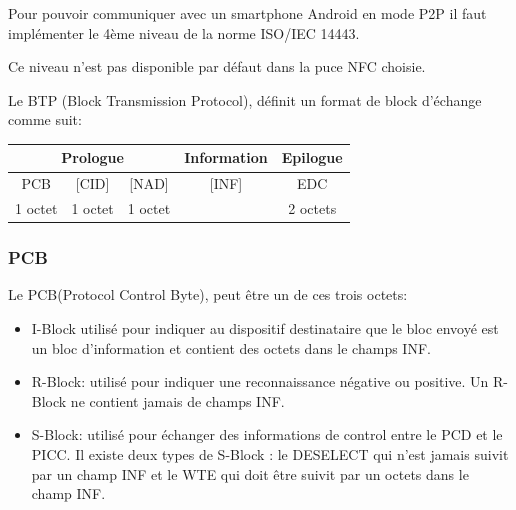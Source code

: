 \documentclass{beamer}
\begin{document}
\begin{frame}

Pour pouvoir communiquer avec un smartphone Android en mode P2P il faut implémenter le 4ème niveau de la norme ISO/IEC 14443.

Ce niveau n'est pas disponible par défaut dans la puce NFC choisie.

Le BTP (Block Transmission Protocol), définit un format de block d'échange comme suit:
\begin{tabular}[hf]{|c|c|c|c|c|c|c|c|}
\hline
\multicolumn{3}{|c|}{Prologue} & \multicolumn{3}{c|}{Information} & \multicolumn{2}{c|}{Epilogue} \\
\hline
PCB & [CID] & [NAD] & \multicolumn{3}{|c|}{[INF]} & \multicolumn{2}{c|}{EDC}\\
\hline
1 octet & 1 octet & 1 octet & \multicolumn{3}{|c|}{} & \multicolumn{2}{c|}{2 octets}\\
\hline
\end{tabular}
\end{frame}
\begin{frame}
\frametitle{PCB}
Le PCB(Protocol Control Byte), peut être un de ces trois octets:
\begin{itemize}
\item I-Block utilisé pour indiquer au dispositif destinataire que le bloc envoyé est
un bloc d’information et contient des octets dans le champs INF.
\item R-Block: utilisé pour indiquer une reconnaissance négative ou positive. Un R-
Block ne contient jamais de champs INF.
\item S-Block: utilisé pour échanger des informations de control entre le PCD et le
PICC. Il existe deux types de S-Block : le DESELECT qui n’est jamais suivit par un
champ INF et le WTE qui doit être suivit par un octets dans le champ INF.
\end{itemize}
\end{frame}
\end{document}
